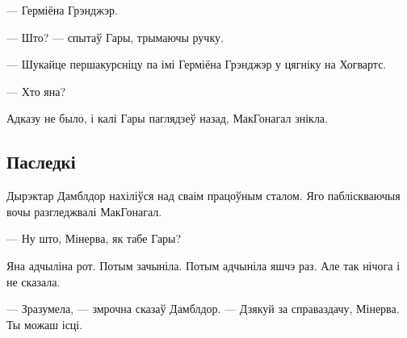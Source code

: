 --- Герміёна Грэнджэр.

--- Што? --- спытаў Гары, трымаючы ручку.

--- Шукайце першакурсніцу па імі Герміёна Грэнджэр у цягніку на Хогвартс.

--- Хто яна?

Адказу не было, і калі Гары паглядзеў назад, МакГонагал знікла.


\subsection{Паследкі}

Дырэктар Дамблдор нахіліўся над сваім працоўным сталом. Яго пабліскваючыя вочы
разгледжвалі МакГонагал.

--- Ну што, Мінерва, як табе Гары?

Яна адчыліна рот. Потым зачыніла. Потым адчыніла яшчэ раз. Але так нічога і не
сказала.

--- Зразумела, --- змрочна сказаў Дамблдор. --- Дзякуй за справаздачу, Мінерва.
Ты можаш ісці.
